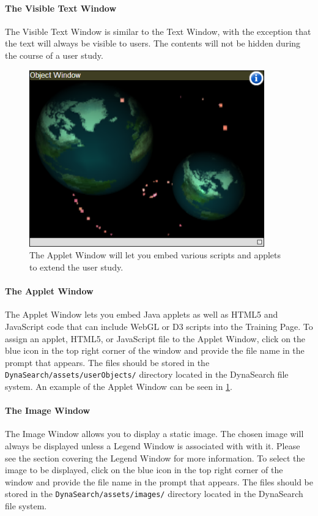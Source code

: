 \documentclass[article]{ij4uq}              %
\begin{document}
\paragraph{The Visible Text Window}
The Visible Text Window is similar to the Text Window, with the exception that the text will always be visible to users.  The contents will not be hidden during the course of a user study.

\begin{figure}[h!]
 \centering
 \includegraphics[width=4.0in]{figures/webgl.png}
 \caption{The Applet Window will let you embed various scripts and applets to extend the user study.}
 \label{fig:webgl}
\end{figure}
\FloatBarrier

\paragraph{The Applet Window}
The Applet Window lets you embed Java applets as well as HTML5 and JavaScript code that can include WebGL or D3 scripts into the Training Page.  To assign an applet, HTML5, or JavaScript file to the Applet Window, click on the blue icon in the top right corner of the window and provide the file name in the prompt that appears.  The files should be stored in the \texttt{DynaSearch/assets/userObjects/} directory located in the DynaSearch file system.  An example of the Applet Window can be seen in \ref{fig:webgl}.


\paragraph{The Image Window}
The Image Window allows you to display a static image.  The chosen image will always be displayed unless a Legend Window is associated with with it.  Please see the section covering the Legend Window for more information.  To select the image to be displayed, click on the blue icon in the top right corner of the window and provide the file name in the prompt that appears.   The files should be stored in the \texttt{DynaSearch/assets/images/} directory located in the DynaSearch file system.
\end{document}
